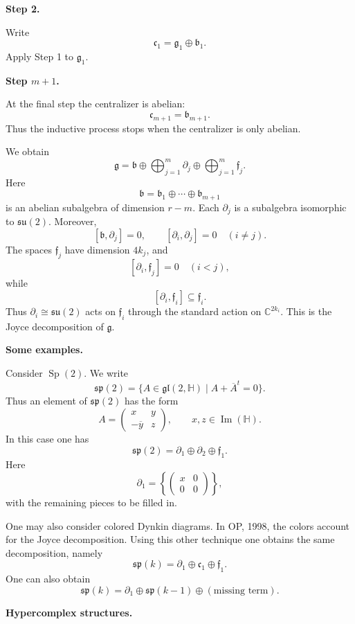 \medskip\noindent
{\bf Step 2.}

Write
\[
\mathfrak c_1
=
\mathfrak g_1\oplus\mathfrak b_1.
\]
Apply Step 1 to $\mathfrak g_1$.

\medskip\noindent
{\bf Step $m+1$.}

At the final step the centralizer is
abelian:
\[
\mathfrak c_{m+1}
=
\mathfrak b_{m+1}.
\]
Thus the inductive process stops when
the centralizer is only abelian.

We obtain
\[
\mathfrak g
=
\mathfrak b
\oplus
\bigoplus_{j=1}^m \partial_j
\oplus
\bigoplus_{j=1}^m \mathfrak f_j.
\]
Here
\[
\mathfrak b
=
\mathfrak b_1\oplus\cdots
\oplus\mathfrak b_{m+1}
\]
is an abelian subalgebra of dimension
$r-m$.
Each $\partial_j$ is a subalgebra
isomorphic to $\mathfrak{su}(2)$.
Moreover,
\[
[\mathfrak b,\partial_j]=0,
\qquad
[\partial_i,\partial_j]=0
\quad (i\ne j).
\]
The spaces $\mathfrak f_j$ have
dimension $4k_j$, and
\[
[\partial_i,\mathfrak f_j]=0
\quad (i<j),
\]
while
\[
[\partial_i,\mathfrak f_i]
\subseteq
\mathfrak f_i.
\]
Thus $\partial_i\cong\mathfrak{su}(2)$
acts on $\mathfrak f_i$ through the
standard action on $\mathbb{C}^{2k_i}$.
This is the Joyce decomposition of
$\mathfrak g$.

\medskip\noindent
{\bf Some examples.}

Consider $\operatorname{Sp}(2)$.
We write
\[
\mathfrak{sp}(2)
=
\{A\in\mathfrak{gl}(2,\mathbb{H})
\mid A+\overline{A}^t=0\}.
\]
Thus an element of $\mathfrak{sp}(2)$
has the form
\[
A=
\begin{pmatrix}
x & y\\
-\overline y & z
\end{pmatrix},
\qquad
x,z\in\operatorname{Im}(\mathbb{H}).
\]
In this case one has
\[
\mathfrak{sp}(2)
=
\partial_1\oplus\partial_2
\oplus\mathfrak f_1.
\]
Here
\[
\partial_1
=
\left\{
\begin{pmatrix}
x & 0\\
0 & 0
\end{pmatrix}
\right\},
\]
with the remaining pieces to be filled
in.

One may also consider colored Dynkin
diagrams.
In OP, 1998, the colors account for
the Joyce decomposition.
Using this other technique one obtains
the same decomposition, namely
\[
\mathfrak{sp}(k)
=
\partial_1\oplus\mathfrak c_1
\oplus\mathfrak f_1.
\]
One can also obtain
\[
\mathfrak{sp}(k)
=
\partial_1\oplus\mathfrak{sp}(k-1)
\oplus(\text{missing term}).
\]

\medskip\noindent
{\bf Hypercomplex structures.}

